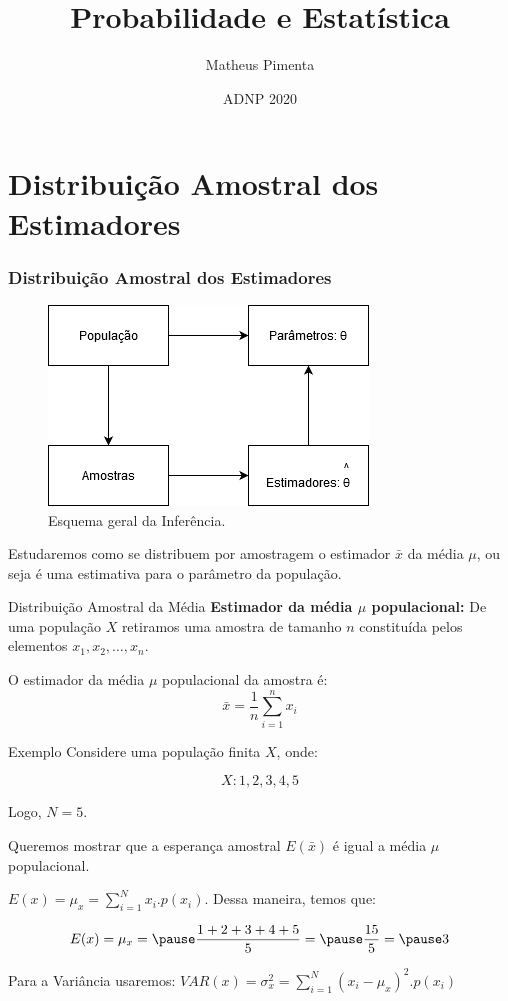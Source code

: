 \documentclass[hyperref={pdfpagelabels=false}]{beamer}
\title{Probabilidade e Estatística}
\author[Matheus Pimenta]{Matheus Pimenta}
\institute[UTFPR-CP]{\normalsize Universidade Tecnológica Federal do Paraná \\
	Câmpus Cornélio Procópio
}
\date{ADNP 2020}
\begin{document}
	
\begin{frame}
\titlepage
\end{frame} 




\section{Distribuição Amostral dos Estimadores} 

\begin{frame}
\frametitle{Distribuição Amostral dos Estimadores}
\pause
\begin{figure}[h]
	\centering
	\includegraphics[width=0.5\linewidth]{diagrama}
	\caption{Esquema geral da Inferência.}
	\label{fig:diagrama}
\end{figure}

\pause
Estudaremos como se distribuem por amostragem o estimador $\bar{x}$ da média $\mu$, ou seja é uma estimativa para o parâmetro da população.

\end{frame}

\begin{frame}{Distribuição Amostral da Média}
	\textbf{Estimador da média $\mu$ populacional:} De uma população $X$ retiramos uma amostra de tamanho $n$ constituída pelos elementos $x_1,x_2,\dots,x_n$.
	
	\pause
	O estimador da média $\mu$ populacional da amostra é:
	$$\bar{x} = \displaystyle \frac{1}{n}\sum_{i=1}^{n}x_i$$
\end{frame}

\begin{frame}{Exemplo}
	Considere uma população finita $X$, onde:
	
	$$X:1,2,3,4,5$$
	
	\pause
	Logo, $N=5$.
	
	\pause
	Queremos mostrar que a esperança amostral $E(\bar{x})$ é igual a média $\mu$ populacional.
	
	\pause
	$E(x) = \mu_x = \displaystyle \sum_{i=1}^{N}x_i . p(x_i)$. \pause Dessa maneira, temos que:
	
	$$E(x) = \mu_x = \pause \displaystyle \frac{1+2+3+4+5}{5} = \pause \displaystyle \frac{15}{5} = \pause 3$$
	
	\pause
	
	Para a Variância usaremos: \pause $VAR(x) = \sigma_{x}^2 = \displaystyle \sum_{i=1}^{N}(x_i - \mu_x)^2 . p(x_i)$
\end{frame}
\end{document}
